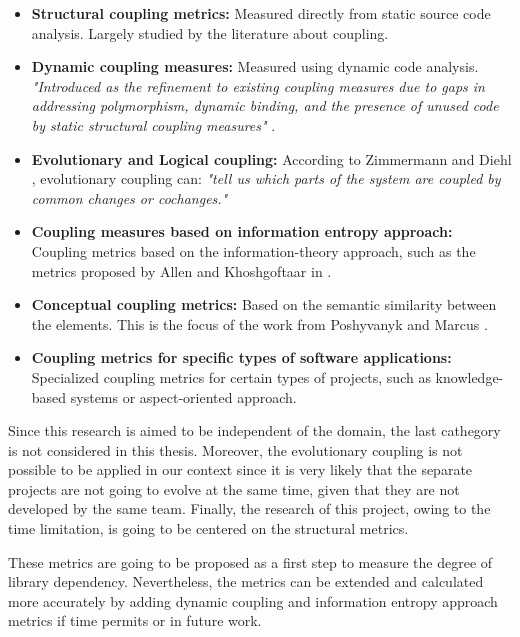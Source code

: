 \begin{itemize}
  \item \textbf{Structural coupling metrics:} Measured directly from static source code analysis. Largely studied by the literature about coupling.

  \item \textbf{Dynamic coupling measures:} Measured using dynamic code analysis. \textit{"Introduced as the refinement to existing coupling measures due to gaps in addressing polymorphism, dynamic binding, and the presence of unused code by static structural coupling measures"} \cite{poshyvanyk2006conceptual}.

  \item \textbf{Evolutionary and Logical coupling:} According to Zimmermann and Diehl \cite{zimmermann2005mining}, evolutionary coupling can: \textit{"tell us which parts of the system are coupled by common changes or cochanges."}

  \item \textbf{Coupling measures based on information entropy approach:} Coupling metrics based on the information-theory approach, such as the metrics proposed by Allen and Khoshgoftaar in \cite{allen1999measuring}.

  \item \textbf{Conceptual coupling metrics:} Based on the semantic similarity between the elements. This is the focus of the work from Poshyvanyk and Marcus \cite{poshyvanyk2006conceptual}.

  \item \textbf{Coupling metrics for specific types of software applications:} Specialized coupling metrics for certain types of projects, such as knowledge-based systems or aspect-oriented approach.
\end{itemize}

\blankl
Since this research is aimed to be independent of the domain, the last cathegory is not considered in this thesis. Moreover, the evolutionary coupling is not possible to be applied in our context since it is very likely that the separate projects are not going to evolve at the same time, given that they are not developed by the same team. Finally, the research of this project, owing to the time limitation, is going to be centered on the structural metrics.

These metrics are going to be proposed as a first step to measure the degree of library dependency. Nevertheless, the metrics can be extended and calculated more accurately by adding dynamic coupling and information entropy approach metrics if time permits or in future work.


